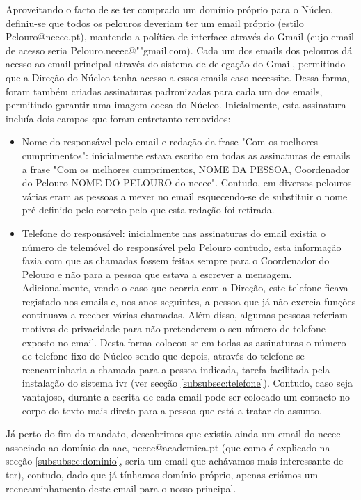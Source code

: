 Aproveitando o facto de se ter comprado um domínio próprio para o Núcleo, definiu-se que todos os pelouros deveriam ter um email próprio (estilo Pelouro@neeec.pt), mantendo a política de interface através do Gmail (cujo email de acesso seria Pelouro.neeec@""gmail.com). Cada um dos emails dos pelouros dá acesso ao email principal através do sistema de delegação do Gmail, permitindo que a Direção do Núcleo tenha acesso a esses emails caso necessite. Dessa forma, foram também criadas assinaturas padronizadas para cada um dos emails, permitindo garantir uma imagem coesa do Núcleo. Inicialmente, esta assinatura incluía dois campos que foram entretanto removidos:
\begin{itemize}
\item Nome do responsável pelo email e redação da frase "Com os melhores cumprimentos": inicialmente estava escrito em todas as assinaturas de emails a frase "Com os melhores cumprimentos, NOME DA PESSOA, Coordenador do Pelouro NOME DO PELOURO do \acrshort{neeec}". Contudo, em diversos pelouros várias eram as pessoas a mexer no email esquecendo-se de substituir o nome pré-definido pelo correto pelo que esta redação foi retirada.
\item Telefone do responsável: inicialmente nas assinaturas do email existia o número de telemóvel do responsável pelo Pelouro contudo, esta informação fazia com que as chamadas fossem feitas sempre para o Coordenador do Pelouro e não para a pessoa que estava a escrever a mensagem. Adicionalmente, vendo o caso que ocorria com a Direção, este telefone ficava registado nos emails e, nos anos seguintes, a pessoa que já não exercia funções continuava a receber várias chamadas. Além disso, algumas pessoas referiam motivos de privacidade para não pretenderem o seu número de telefone exposto no email. Desta forma colocou-se em todas as assinaturas o número de telefone fixo do Núcleo sendo que depois, através do telefone se reencaminharia a chamada para a pessoa indicada, tarefa facilitada pela instalação do sistema \acrshort{ivr} (ver secção \ref{subsubsec:telefone}). Contudo, caso seja vantajoso, durante a escrita de cada email pode ser colocado um contacto no corpo do texto mais direto para a pessoa que está a tratar do assunto.
\end{itemize}

Já perto do fim do mandato, descobrimos que existia ainda um email do \acrshort{neeec} associado ao domínio da \acrshort{aac}, neeec@academica.pt (que como é explicado na secção \ref{subsubsec:dominio}, seria um email que achávamos mais interessante de ter), contudo, dado que já tínhamos domínio próprio, apenas criámos um reencaminhamento deste email para o nosso principal.

